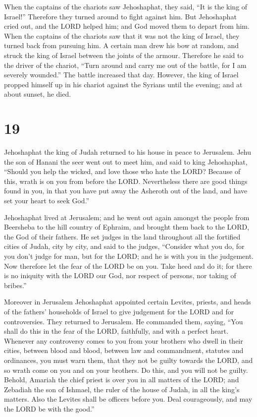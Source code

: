  When the captains of the chariots saw Jehoshaphat, they
said, ``It is the king of Israel!'' Therefore they turned around to
fight against him. But Jehoshaphat cried out, and the LORD helped him;
and God moved them to depart from him.  When the captains
of the chariots saw that it was not the king of Israel, they turned back
from pursuing him.  A certain man drew his bow at random,
and struck the king of Israel between the joints of the armour.
Therefore he said to the driver of the chariot, ``Turn around and carry
me out of the battle, for I am severely wounded.''  The
battle increased that day. However, the king of Israel propped himself
up in his chariot against the Syrians until the evening; and at about
sunset, he died.

\hypertarget{section-18}{%
\section{19}\label{section-18}}

 Jehoshaphat the king of Judah returned to his house in
peace to Jerusalem.  Jehu the son of Hanani the seer went
out to meet him, and said to king Jehoshaphat, ``Should you help the
wicked, and love those who hate the LORD? Because of this, wrath is on
you from before the LORD.  Nevertheless there are good
things found in you, in that you have put away the Asheroth out of the
land, and have set your heart to seek God.''

 Jehoshaphat lived at Jerusalem; and he went out again
amongst the people from Beersheba to the hill country of Ephraim, and
brought them back to the LORD, the God of their fathers. 
He set judges in the land throughout all the fortified cities of Judah,
city by city,  and said to the judges, ``Consider what you
do, for you don't judge for man, but for the LORD; and he is with you in
the judgement.  Now therefore let the fear of the LORD be
on you. Take heed and do it; for there is no iniquity with the LORD our
God, nor respect of persons, nor taking of bribes.''

 Moreover in Jerusalem Jehoshaphat appointed certain
Levites, priests, and heads of the fathers' households of Israel to give
judgement for the LORD and for controversies. They returned to
Jerusalem.  He commanded them, saying, ``You shall do this
in the fear of the LORD, faithfully, and with a perfect heart.
 Whenever any controversy comes to you from your brothers
who dwell in their cities, between blood and blood, between law and
commandment, statutes and ordinances, you must warn them, that they not
be guilty towards the LORD, and so wrath come on you and on your
brothers. Do this, and you will not be guilty.  Behold,
Amariah the chief priest is over you in all matters of the LORD; and
Zebadiah the son of Ishmael, the ruler of the house of Judah, in all the
king's matters. Also the Levites shall be officers before you. Deal
courageously, and may the LORD be with the good.''

